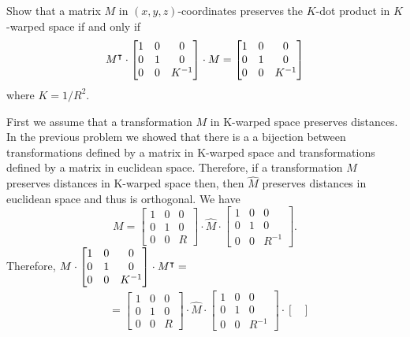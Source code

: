 \documentclass[newpage,hints,handout,noauthor,nooutcomes,12pt]{ximera}
\begin{document}
\begin{problem}
  Show that a matrix $M$ in $(x,y,z)$-coordinates preserves the
  $K$-dot product in $K$-warped space if and only if%
  \[
    M^\intercal \cdot\begin{bmatrix}
    1 & 0 & 0\\
    0 & 1 & 0\\
    0 & 0 & K^{-1}
    \end{bmatrix}
    \cdot M=\begin{bmatrix}
    1 & 0 & 0\\
    0 & 1 & 0\\
    0 & 0 & K^{-1}
    \end{bmatrix}
  \]
  where $K = 1/R^2$.

\begin{freeResponse}
First we assume that a transformation $M$ in K-warped space preserves
distances. In the previous problem we showed that there is a a
bijection between transformations defined by a matrix in K-warped
space and transformations defined by a matrix in euclidean
space. Therefore, if a transformation $M$ preserves distances in
K-warped space then, then $\hat{M}$ preserves distances in euclidean
space and thus is orthogonal. We have
\[
M = \begin{bmatrix}
1 & 0 & 0\\
0 & 1 & 0\\
0 & 0 & R
\end{bmatrix}
  \cdot\hat{M}\cdot \begin{bmatrix}
1 & 0 & 0\\
0 & 1 & 0\\
0 & 0 & R^{-1}
\end{bmatrix}. 
\]
Therefore, $M\cdot \begin{bmatrix}
1 & 0 & 0\\
0 & 1 & 0\\
0 & 0 & K^{-1}
\end{bmatrix}
  \cdot M^\intercal=$
\begin{align*}
 &= \begin{bmatrix}
1 & 0 & 0\\
0 & 1 & 0\\
0 & 0 & R
\end{bmatrix} \cdot \hat{M} \cdot
\begin{bmatrix}
1 & 0 & 0\\
0 & 1 & 0\\
0 & 0 & R^{-1}
\end{bmatrix} \cdot 
\begin{bmatrix}

\end{bmatrix}
\end{align*}
\end{freeResponse}
\end{problem}
\end{document}
